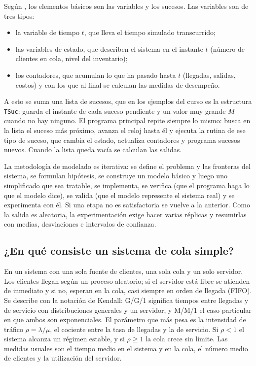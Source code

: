 \documentclass[11pt,letterpaper]{article}
\begin{document}
Según \cite{rios08}, los elementos básicos son las variables y los sucesos. Las variables son de tres tipos:

\begin{itemize}[itemsep=1pt]
\item la variable de tiempo $t$, que lleva el tiempo simulado transcurrido;
\item las variables de estado, que describen el sistema en el instante $t$ (número de clientes en
cola, nivel del inventario);
\item los contadores, que acumulan lo que ha pasado hasta $t$ (llegadas, salidas, costos) y con los
que al final se calculan las medidas de desempeño.
\end{itemize}

A esto se suma una lista de sucesos, que en los ejemplos del curso es la estructura
\texttt{TSuc}: guarda el instante de cada suceso pendiente y un valor muy grande $M$ cuando no hay ninguno.
El programa principal repite siempre lo mismo: busca en la lista el suceso más próximo, avanza el reloj hasta
él y ejecuta la rutina de ese tipo de suceso, que cambia el estado, actualiza contadores y programa sucesos
nuevos. Cuando la lista queda vacía se calculan las salidas.

La metodología de modelado es iterativa: se define el problema y las fronteras del sistema, se formulan
hipótesis, se construye un modelo básico y luego uno simplificado que sea tratable, se implementa, se
verifica (que el programa haga lo que el modelo dice), se valida (que el modelo represente el sistema real) y
se experimenta con él. Si una etapa no es satisfactoria se vuelve a la anterior. Como la salida es aleatoria,
la experimentación exige hacer varias réplicas y resumirlas con medias, desviaciones e intervalos de
confianza.

\subsection{¿En qué consiste un sistema de cola simple?}

En un sistema con una sola fuente de clientes, una sola cola y un solo servidor. Los clientes llegan según un
proceso aleatorio; si el servidor está libre se atienden de inmediato y si no, esperan en la cola, casi siempre
en orden de llegada (FIFO). Se describe con la notación de Kendall: G/G/1 significa tiempos entre llegadas y de
servicio con distribuciones generales y un servidor, y M/M/1 el caso particular en que ambos son exponenciales.
El parámetro que más pesa es la intensidad de tráfico $\rho = \lambda/\mu$, el cociente entre la tasa de
llegadas y la de servicio. Si $\rho < 1$ el sistema alcanza un régimen estable, y si $\rho \ge 1$ la cola crece
sin límite. Las medidas usuales son el tiempo medio en el sistema y en la cola, el número medio de clientes y
la utilización del servidor.
\end{document}
